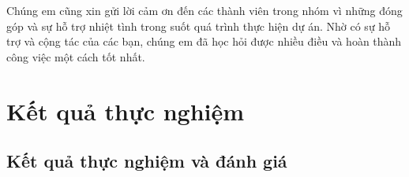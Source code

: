 \documentclass[conference]{IEEEtran}
\begin{document}
Chúng em cũng xin gửi lời cảm ơn đến các thành viên trong nhóm vì những đóng góp và sự hỗ trợ nhiệt tình trong suốt quá trình thực hiện dự án. Nhờ có sự hỗ trợ và cộng tác của các bạn, chúng em đã học hỏi được nhiều điều và hoàn thành công việc một cách tốt nhất.
\section{Kết quả thực nghiệm}

\subsection{Kết quả thực nghiệm và đánh giá}
\end{document}
